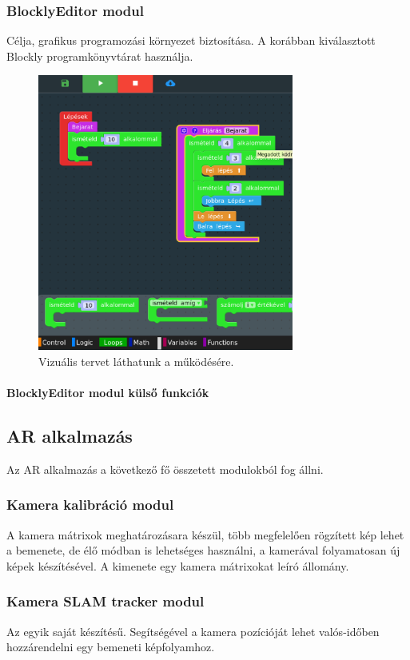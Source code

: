 \documentclass[12pt,a4paper,oneside]{report} %
\begin{document}
\subsubsection{BlocklyEditor modul}
Célja, grafikus programozási környezet biztosítása. A korábban kiválasztott Blockly programkönyvtárat használja. 
\begin{figure}[h]
	
	\centering
	\includegraphics[width=0.75\textwidth]{2Vf5as}
	\caption{Vizuális tervet láthatunk a működésére.}%
	\label{fig:Block}
\end{figure}


\paragraph{BlocklyEditor modul külső funkciók}

\subsection{AR alkalmazás}
Az AR alkalmazás a következő fő összetett modulokból fog állni.
\subsubsection{Kamera kalibráció modul} 
A kamera mátrixok meghatározásara készül, több megfelelően rögzített kép lehet a bemenete, de élő módban is lehetséges használni, a kamerával folyamatosan új képek készítésével. A kimenete egy kamera mátrixokat leíró állomány.
\subsubsection{Kamera SLAM tracker modul}
Az egyik saját készítésű. Segítségével a kamera pozícióját lehet valós-időben hozzárendelni egy bemeneti képfolyamhoz.
\end{document}
